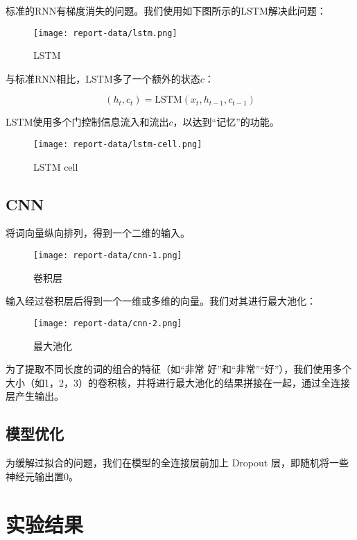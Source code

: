 \documentclass[a4paper]{article}
\begin{document}
标准的RNN有梯度消失的问题。我们使用如下图所示的LSTM解决此问题：

\begin{figure}[H]
    \centering
    \texttt{[image: report-data/lstm.png]}
    \caption{LSTM}
\end{figure}

与标准RNN相比，LSTM多了一个额外的状态$c$：

\begin{equation}
    (h_t,c_t)=\textrm{LSTM}(x_t,h_{t-1},c_{t-1})
\end{equation}

LSTM使用多个门控制信息流入和流出$c$，以达到“记忆”的功能。

\begin{figure}[H]
    \centering
    \texttt{[image: report-data/lstm-cell.png]}
    \caption{LSTM cell}
\end{figure}

\subsection{CNN}

将词向量纵向排列，得到一个二维的输入。

\begin{figure}[H]
    \centering
    \texttt{[image: report-data/cnn-1.png]}
    \caption{卷积层}
\end{figure}

输入经过卷积层后得到一个一维或多维的向量。我们对其进行最大池化：

\begin{figure}[H]
    \centering
    \texttt{[image: report-data/cnn-2.png]}
    \caption{最大池化}
\end{figure}

为了提取不同长度的词的组合的特征（如“非常 好”和“非常”“好”），我们使用多个大小（如1，2，3）的卷积核，并将进行最大池化的结果拼接在一起，通过全连接层产生输出。

\subsection{模型优化}

为缓解过拟合的问题，我们在模型的全连接层前加上 Dropout 层，即随机将一些神经元输出置0。

\section{实验结果}
\end{document}
